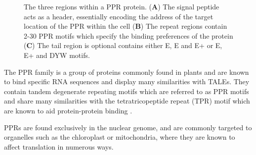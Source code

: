 \begin{figure}
  \begin{center}
  \end{center}
  \caption[LoF entry]{
    The three regions within a PPR protein.
    (\textbf{A}) The signal peptide acts as a header, essentially encoding the
    address of the target location of the PPR within the cell
    (\textbf{B}) The repeat regions contain 2-30 PPR motifs which specify the binding
    preferences of the protein
    (\textbf{C}) The tail region is optional contains either E, E and E+ or 
    E, E+ and DYW motifs.
  }
  \label{fig:ppr_anatomy}
\end{figure}

The PPR family is a group of proteins commonly found in plants and are known
to bind specific RNA sequences and display many similarities with TALEs.
They contain tandem degenerate repeating motifs which are referred to as PPR 
motifs and share many similarities with the tetratricopeptide repeat (TPR) 
motif which are known to aid protein-protein binding \citep{Small2000}.

PPRs are found exclusively in the nuclear genome, and are commonly targeted to
organelles such as the chloroplast or mitochondria, where they are known to
affect translation in numerous ways.

